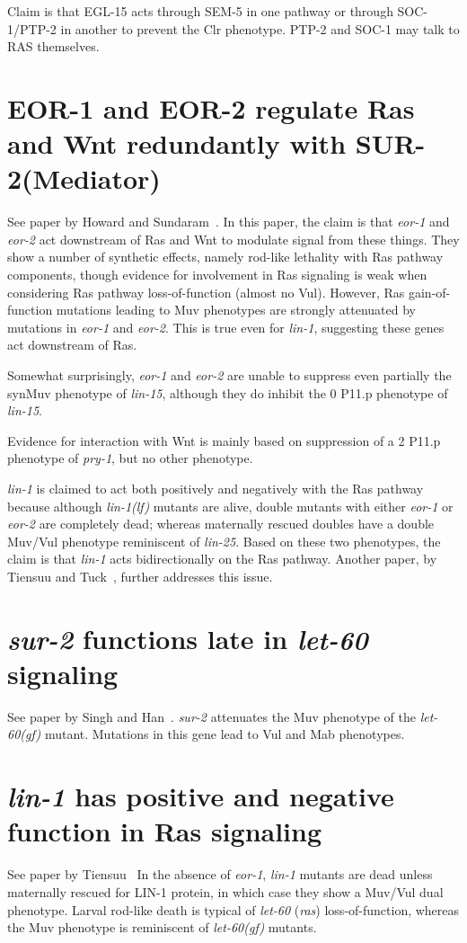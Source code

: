 \documentclass[10pt, onecolumn]{article}
\newcommand{\gene}[1]{\mbox{\emph{#1}}}
\newcommand{\ras}{\gene{let-60} (\emph{ras})}
\newcommand{\letgf}{\gene{let-60(gf)}}
\begin{document}
Claim is that EGL-15 acts through SEM-5 in one pathway or through SOC-1/PTP-2
in another to prevent the Clr phenotype. PTP-2 and SOC-1 may talk to RAS themselves.

\section*{EOR-1 and EOR-2 regulate Ras and Wnt redundantly with SUR-2(Mediator)}
See paper by Howard and Sundaram~\cite{Howard2002}. In this paper, the claim is that
\gene{eor-1} and \gene{eor-2} act downstream of Ras and Wnt to modulate signal
from these things. They show a number of synthetic effects, namely rod-like
lethality with Ras pathway components, though evidence for involvement in Ras
signaling is weak when considering Ras pathway loss-of-function (almost no Vul).
However, Ras gain-of-function mutations leading to Muv phenotypes are strongly
attenuated by mutations in \gene{eor-1} and \gene{eor-2}. This is true even
for \gene{lin-1}, suggesting these genes act downstream of Ras.

Somewhat surprisingly, \gene{eor-1} and \gene{eor-2} are unable to suppress even
partially the synMuv phenotype of \gene{lin-15}, although they do inhibit the
0 P11.p phenotype of \gene{lin-15}.

Evidence for interaction with Wnt is mainly based on suppression of a 2 P11.p
phenotype of \gene{pry-1}, but no other phenotype.

\gene{lin-1} is claimed to act both positively and negatively with the Ras pathway
because although \gene{lin-1(lf)} mutants are alive, double mutants with either
\gene{eor-1} or \gene{eor-2} are completely dead; whereas maternally rescued
doubles have a double Muv/Vul phenotype reminiscent of \gene{lin-25}. Based on
these two phenotypes, the claim is that \gene{lin-1} acts bidirectionally on
the Ras pathway. Another paper, by Tiensuu and Tuck~\cite{}, further addresses
this issue.

\section*{\gene{sur-2} functions late in \gene{let-60} signaling}
See paper by Singh and Han~\cite{}. \gene{sur-2} attenuates the Muv phenotype of
the \letgf{} mutant. Mutations in this gene lead to Vul and Mab phenotypes.

\section*{\gene{lin-1} has positive and negative function in Ras signaling}
See paper by Tiensuu~\cite{Tiensuu2005}
In the absence of \gene{eor-1}, \gene{lin-1} mutants are dead unless maternally
rescued for LIN-1 protein, in which case they show a Muv/Vul dual phenotype.
Larval rod-like death is typical of \ras{} loss-of-function, whereas the Muv
phenotype is reminiscent of \letgf{} mutants.
\end{document}
